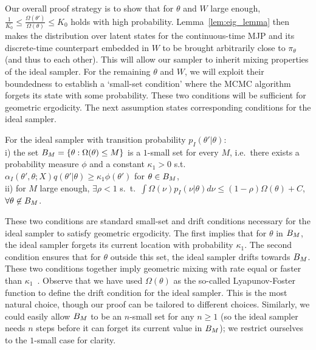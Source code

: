 Our overall proof strategy is to show that for $\theta$ and $W$ large enough, 
$ \frac{1}{K_0} \le \frac{\Omega(\theta')}{\Omega(\theta)} \le K_0 $ holds with 
high probability. Lemma~\ref{lem:eig_lemma} then makes the distribution 
over latent states for the continuous-time MJP and its discrete-time 
counterpart embedded in $W$ to be brought arbitrarily close to $\pi_\theta$ 
(and thus to each other).
This will allow our sampler 
to inherit mixing properties of the ideal sampler. For the remaining 
$\theta$ and $W$, we will exploit their boundedness to establish a 
`small-set condition' where the MCMC algorithm forgets its state with 
some probability. These two conditions will be sufficient for 
geometric ergodicity. The next assumption states corresponding conditions 
for the ideal sampler.

\begin{assumption}
For the ideal sampler with transition probability $p_I(\theta'|\theta)$: \\
i) the set $B_M=\{\theta:\Omega(\theta)\le M \}$ is a $1$-small set for
every
$M$, i.e.\ there exists a probability measure $\phi$ and a constant
$\kappa_1 > 0$ s.t.\ %
$\alpha_I(\theta', \theta; X) q(\theta' | \theta) \ge \kappa_1 \phi(\theta')$
 for $\theta \in B_M$, \\
ii) for $M$ large enough, $\exists \rho < 1$ s.\ t.\
$\int \Omega(\nu) p_I(\nu|\theta) d\nu
\leq (1-\rho) \Omega(\theta)+C$, $\forall \theta \not\in B_M$.
  \label{asmp:ideal_geom}
\end{assumption}
\noindent %
These two conditions are standard
small-set and drift conditions necessary for the ideal sampler to satisfy
geometric ergodicity. The first implies that for $\theta$ in
$B_M$, the ideal sampler forgets its current
location with probability $\kappa_1$. The second condition ensures that
for $\theta$ outside this set, the ideal sampler drifts towards
$B_M$. These two conditions together imply geometric
mixing with rate equal or faster than $\kappa_1$~\cite{meyn2009}.
Observe that we have used $\Omega(\theta)$ as the so-called 
Lyapunov-Foster function to define the drift condition for the ideal 
sampler. %
This is the most natural choice,
though our proof can be tailored to different choices. Similarly, we
could easily allow $B_M$ to be an $n$-small set for any $n\ge 1$ (so
the ideal sampler needs $n$ steps before it can forget its current
value in $B_M$); we restrict ourselves to the $1$-small case for
clarity.



